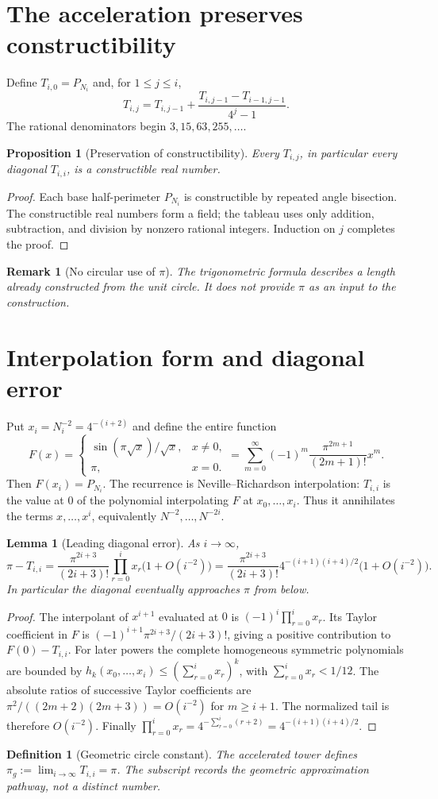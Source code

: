 \documentclass[11pt]{article}
\newtheorem{proposition}{Proposition}
\newtheorem{lemma}{Lemma}
\newtheorem{definition}{Definition}
\newtheorem{remark}{Remark}
\begin{document}
\section{The acceleration preserves constructibility}
Define $T_{i,0}=P_{N_i}$ and, for $1\le j\le i$,
\[
T_{i,j}=T_{i,j-1}+\frac{T_{i,j-1}-T_{i-1,j-1}}{4^j-1}.
\]
The rational denominators begin $3,15,63,255,\ldots$.
\begin{proposition}[Preservation of constructibility]
Every $T_{i,j}$, in particular every diagonal $T_{i,i}$, is a constructible real number.
\end{proposition}
\begin{proof}
Each base half-perimeter $P_{N_i}$ is constructible by repeated angle bisection. The constructible real numbers form a field; the tableau uses only addition, subtraction, and division by nonzero rational integers. Induction on $j$ completes the proof.
\end{proof}
\begin{remark}[No circular use of $\pi$]
The trigonometric formula describes a length already constructed from the unit circle. It does not provide $\pi$ as an input to the construction.
\end{remark}
\section{Interpolation form and diagonal error}
Put $x_i=N_i^{-2}=4^{-(i+2)}$ and define the entire function
\[
F(x)=\begin{cases}\sin(\pi\sqrt x)/\sqrt x,&x\ne0,\\ \pi,&x=0.\end{cases}
=\sum_{m=0}^{\infty}(-1)^m\frac{\pi^{2m+1}}{(2m+1)!}x^m.
\]
Then $F(x_i)=P_{N_i}$. The recurrence is Neville--Richardson interpolation: $T_{i,i}$ is the value at $0$ of the polynomial interpolating $F$ at $x_0,\ldots,x_i$. Thus it annihilates the terms $x,\ldots,x^i$, equivalently $N^{-2},\ldots,N^{-2i}$.
\begin{lemma}[Leading diagonal error]
As $i\to\infty$,
\[
\pi-T_{i,i}=\frac{\pi^{2i+3}}{(2i+3)!}\prod_{r=0}^{i}x_r\bigl(1+O(i^{-2})\bigr)
=\frac{\pi^{2i+3}}{(2i+3)!}4^{-(i+1)(i+4)/2}\bigl(1+O(i^{-2})\bigr).
\]
In particular the diagonal eventually approaches $\pi$ from below.
\end{lemma}
\begin{proof}
The interpolant of $x^{i+1}$ evaluated at $0$ is $(-1)^i\prod_{r=0}^i x_r$. Its Taylor coefficient in $F$ is $(-1)^{i+1}\pi^{2i+3}/(2i+3)!$, giving a positive contribution to $F(0)-T_{i,i}$. For later powers the complete homogeneous symmetric polynomials are bounded by $h_k(x_0,\ldots,x_i)\le(\sum_{r=0}^ix_r)^k$, with $\sum_{r=0}^ix_r<1/12$. The absolute ratios of successive Taylor coefficients are $\pi^2/((2m+2)(2m+3))=O(i^{-2})$ for $m\ge i+1$. The normalized tail is therefore $O(i^{-2})$. Finally $\prod_{r=0}^ix_r=4^{-\sum_{r=0}^i(r+2)}=4^{-(i+1)(i+4)/2}$.
\end{proof}
\begin{definition}[Geometric circle constant]
The accelerated tower defines $\pi_g:=\lim_{i\to\infty}T_{i,i}=\pi$. The subscript records the geometric approximation pathway, not a distinct number.
\end{definition}
\end{document}
